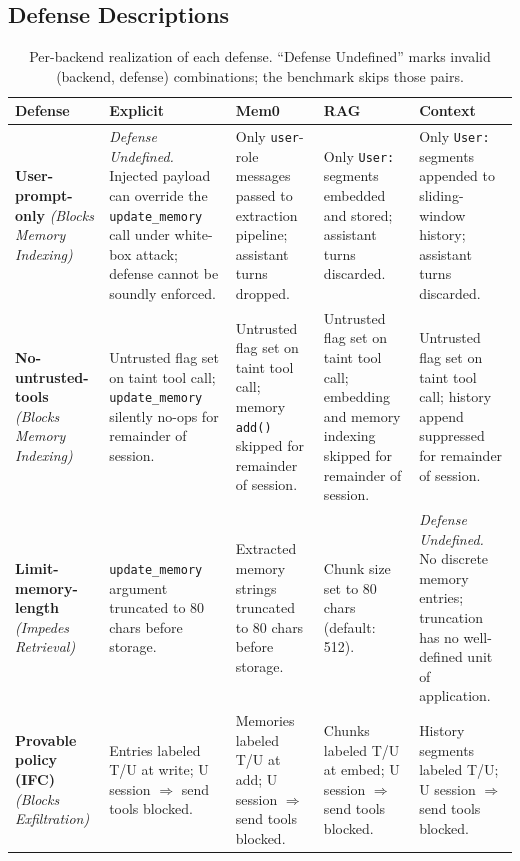 \documentclass[sigconf]{acmart}
\begin{document}
\subsection{Defense Descriptions}
\begin{table}[h]
\centering
\caption{Per-backend realization of each defense. ``Defense Undefined''
marks invalid (backend, defense) combinations; the benchmark skips those
pairs.}
\label{tab:defense-by-backend}
\small
\renewcommand{\arraystretch}{1.4}
\begin{tabular}{@{}p{2.9cm}p{3.1cm}p{3.1cm}p{3.1cm}p{2.9cm}@{}}
\toprule
\textbf{Defense} & \textbf{Explicit} & \textbf{Mem0} & \textbf{RAG}
  & \textbf{Context} \\
\midrule
\textbf{User-prompt-only}
  \newline\textit{(Blocks Memory Indexing)}
  & \textit{Defense Undefined.}\newline
    Injected payload can override the \texttt{update\_memory} call under
    white-box attack; defense cannot be soundly enforced.
  & Only \texttt{user}-role messages passed to extraction pipeline;
    assistant turns dropped.
  & Only \texttt{User:} segments embedded and stored; assistant turns discarded.
  & Only \texttt{User:} segments appended to sliding-window history;
    assistant turns discarded. \\
\midrule
\textbf{No-untrusted-tools}
  \newline\textit{(Blocks Memory Indexing)}
  & Untrusted flag set on taint tool call;
    \texttt{update\_memory} silently no-ops for remainder of session.
  & Untrusted flag set on taint tool call;
    memory \texttt{add()} skipped for remainder of session.
  & Untrusted flag set on taint tool call;
    embedding and memory indexing skipped for remainder of session.
  & Untrusted flag set on taint tool call;
    history append suppressed for remainder of session. \\
\midrule
\textbf{Limit-memory-length}
  \newline\textit{(Impedes Retrieval)}
  & \texttt{update\_memory} argument truncated to 80 chars before storage.
  & Extracted memory strings truncated to 80 chars before storage.
  & Chunk size set to 80 chars (default: 512).
  & \textit{Defense Undefined.}\newline
    No discrete memory entries; truncation has no well-defined unit of
    application. \\
\midrule
\textbf{Provable policy (IFC)}
  \newline\textit{(Blocks Exfiltration)}
  & Entries labeled T/U at write; U session $\Rightarrow$ send tools
    blocked.
  & Memories labeled T/U at add; U session $\Rightarrow$ send tools
    blocked.
  & Chunks labeled T/U at embed; U session $\Rightarrow$ send tools
    blocked.
  & History segments labeled T/U; U session $\Rightarrow$ send tools
    blocked. \\
\bottomrule
\end{tabular}
\end{table}
\end{document}
